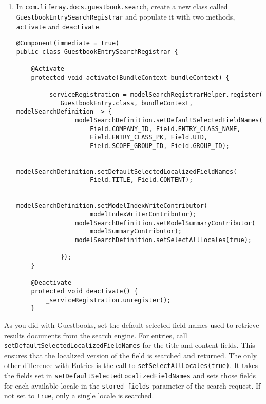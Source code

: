 \begin{enumerate}
\def\labelenumi{\arabic{enumi}.}
\item
  In \texttt{com.liferay.docs.guestbook.search}, create a new class
  called \texttt{GuestbookEntrySearchRegistrar} and populate it with two
  methods, \texttt{activate} and \texttt{deactivate}.

\begin{verbatim}
@Component(immediate = true)
public class GuestbookEntrySearchRegistrar {

    @Activate
    protected void activate(BundleContext bundleContext) {

        _serviceRegistration = modelSearchRegistrarHelper.register(
            GuestbookEntry.class, bundleContext, modelSearchDefinition -> {
                modelSearchDefinition.setDefaultSelectedFieldNames(
                    Field.COMPANY_ID, Field.ENTRY_CLASS_NAME,
                    Field.ENTRY_CLASS_PK, Field.UID, 
                    Field.SCOPE_GROUP_ID, Field.GROUP_ID);

                modelSearchDefinition.setDefaultSelectedLocalizedFieldNames(
                    Field.TITLE, Field.CONTENT);

                modelSearchDefinition.setModelIndexWriteContributor(
                    modelIndexWriterContributor);
                modelSearchDefinition.setModelSummaryContributor(
                    modelSummaryContributor);
                modelSearchDefinition.setSelectAllLocales(true);

            });
    }

    @Deactivate
    protected void deactivate() {
        _serviceRegistration.unregister();
    }
\end{verbatim}
\end{enumerate}

As you did with Guestbooks, set the default selected field names used to
retrieve results documents from the search engine. For entries, call
\texttt{setDefaultSelectedLocalizedFieldNames} for the title and content
fields. This ensures that the localized version of the field is searched
and returned. The only other difference with Entries is the call to
\texttt{setSelectAllLocales(true)}. It takes the fields set in
\texttt{setDefaultSelectedLocalizedFieldNames} and sets those fields for
each available locale in the \texttt{stored\_fields} parameter of the
search request. If not set to \texttt{true}, only a single locale is
searched.

